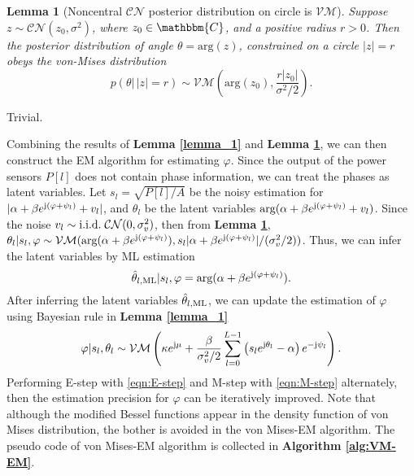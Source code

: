 \documentclass[12pt,draftclsnofoot,journal,onecolumn]{IEEEtran}
\newtheorem{lemma}{\bf Lemma}
\theoremstyle{nonumberplain}
\def \arg {\text{arg}}
\def \CN {\mathcal{CN}}
\def \VM {\mathcal{VM}}
\begin{document}
    \begin{lemma}[Noncentral $\CN$ posterior distribution on circle is $\VM$]\label{lemma_2}
        Suppose $z \sim \CN(z_0, \sigma^2)$, where $z_0 \in \mathbbm{C}$, and a positive radius $r>0$. Then the posterior distribution of angle $\theta= \arg (z)$, constrained on a circle $|z|=r$ obeys the von-Mises distribution
        \begin{equation}
            p(\theta |\, |z|=r) \sim \VM\left(\arg(z_0), \frac{r|z_0|}{\sigma^2/2}\right).
        \end{equation}
    \end{lemma}
    \begin{IEEEproof}
        Trivial.
    \end{IEEEproof}
    Combining the results of {\bf Lemma \ref{lemma_1}} and {\bf Lemma \ref{lemma_2}}, we can then construct the EM algorithm for estimating $\varphi$. Since the output of the power sensors $P[l]$ does not contain phase information, we can treat the phases as latent variables. Let $s_l = \sqrt{P[l]/A}$ be the noisy estimation for $|\alpha + \beta e^{{\rm j} (\varphi + \psi_l)} + v_l|$, and $\theta_l$ be the latent variables $\arg (\alpha + \beta e^{{\rm j} (\varphi + \psi_l)} + v_l)$. Since the noise $v_l \sim {\rm i.i.d.}\;\CN(0, \sigma_v^2)$, then from {\bf Lemma \ref{lemma_2}}, $\theta_l | s_l, \varphi \sim \VM(\arg(\alpha + \beta e^{{\rm j} (\varphi + \psi_l)}), s_l |\alpha + \beta e^{{\rm j} (\varphi + \psi_l)}|/(\sigma_v^2/2))$. Thus, we can infer the latent variables by ML estimation 
    \begin{equation}
        \hat{\theta}_{l, {\rm ML}} | s_l, \varphi = \arg(\alpha + \beta e^{{\rm j} (\varphi + \psi_l)}).
        \label{eqn:E-step}
    \end{equation}
    After inferring the latent variables $\hat{\theta}_{l, {\rm ML}}$, we can update the estimation of $\varphi$ using Bayesian rule in {\bf Lemma \ref{lemma_1}}
    \begin{equation}
        \varphi | s_l, \theta_l \sim \VM\left( \kappa e^{{\rm j} \mu} + \frac{\beta}{\sigma_v^2/2}\sum_{l=0}^{L-1}{\left(s_l e^{{\rm j}\theta_l}-\alpha\right)e^{-{\rm j} \psi_l}}\right).
        \label{eqn:M-step}
    \end{equation}
    Performing E-step with \eqref{eqn:E-step} and M-step with \eqref{eqn:M-step} alternately, then the estimation precision for $\varphi$ can be iteratively improved. Note that although the modified Bessel functions appear in the density function of von Mises distribution, the bother is avoided in the von Mises-EM algorithm. The pseudo code of von Mises-EM algorithm is collected in {\bf Algorithm \ref{alg:VM-EM}}.
\end{document}
